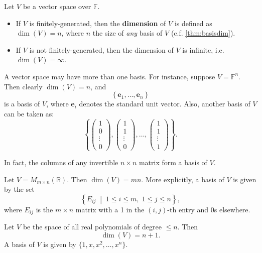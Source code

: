 \begin{definition}[Dimension] \label{def:dimension}
    Let $V$ be a vector space over $\mathbb{F}$. 
    \begin{itemize}
        \item If $V$ is finitely-generated, then the {\bf dimension} of $V$ is defined as $\dim(V) = n$, where $n$ the size of {\it any} basis of $V$ (c.f. \autoref{thm:basisdim}).
        \item If $V$ is not finitely-generated, then the dimension of $V$ is infinite, i.e. $\dim(V) = \infty$.
    \end{itemize}
\end{definition}


\begin{example}
A vector space may have more than one basis. For instance, suppose \(V = \mathbb{F}^n\). Then clearly \(\dim(V) = n\), and
\[
\left\{ \mathbf{e}_1, \ldots, \mathbf{e}_n \right\}
\]
is a basis of \(V\), where \(\mathbf{e}_i\) denotes the standard unit vector. Also, another basis of \(V\) can be taken as:
\[
\left\{
\begin{pmatrix} 1 \\ 0 \\ \vdots \\ 0 \end{pmatrix},
\begin{pmatrix} 1 \\ 1 \\ \vdots \\ 0 \end{pmatrix},
\ldots,
\begin{pmatrix} 1 \\ 1 \\ \vdots \\ 1 \end{pmatrix}
\right\}.
\]

In fact, the columns of any invertible \(n \times n\) matrix form a basis of \(V\).
\end{example}

\begin{example}
Let \(V = M_{m \times n}(\mathbb{R})\). Then \(\dim(V) = mn\). More explicitly, a basis of $V$ is given by the set
\[
\left\{ E_{ij} \;\middle|\; 1 \leq i \leq m,\; 1 \leq j \leq n \right\},
\]
where \(E_{ij}\) is the \(m \times n\) matrix with a 1 in the \((i,j)\)-th entry and 0s elsewhere.
\end{example}

\begin{example}
Let \(V\) be the space of all real polynomials of degree \(\leq n\). Then
\[
\dim(V) = n + 1.
\]
A basis of $V$ is given by \(\{1, x, x^2, \ldots, x^n\}\).
\end{example}

